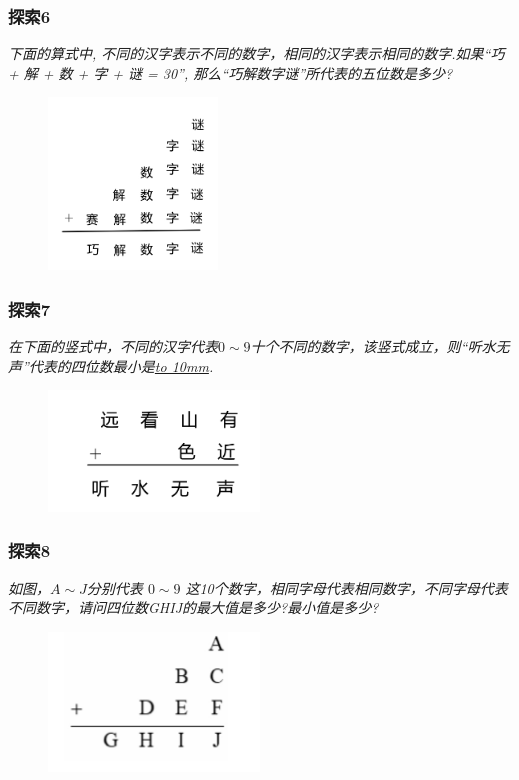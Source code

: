 \begin{frame}
    \frametitle{探索6}
    \textit{下面的算式中, 不同的汉字表示不同的数字，相同的汉字表示相同的数字.如果``巧 + 解 + 数 + 字 + 谜 = 30'', 那么“巧解数字谜”所代表的五位数是多少?}
    \begin{figure}[H] 
        \centering
        \includegraphics[width=0.4\textwidth]{./pics/Chapter_3/tansuo6.png}
    \end{figure}
\end{frame}

\begin{frame}
    \frametitle{探索7}
    \textit{在下面的竖式中，不同的汉字代表$0\sim 9$十个不同的数字，该竖式成立，则“听水无声”代表的四位数最小是\underline{\hbox to 10mm{}}.}
    \begin{figure}[H] 
        \centering
        \includegraphics[width=0.5\textwidth]{./pics/Chapter_3/tansuo7.png}
    \end{figure}
\end{frame}

\begin{frame}
    \frametitle{探索8}
    \textit{如图，$A\sim J$分别代表 $0\sim 9$ 这10个数字，相同字母代表相同数字，不同字母代表不同数字，请问四位数GHIJ的最大值是多少?最小值是多少?}
    \begin{figure}[H] 
        \centering
        \includegraphics[width=0.5\textwidth]{./pics/Chapter_3/tansuo8.png}
    \end{figure}
\end{frame}

